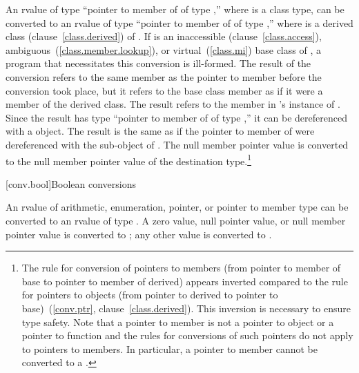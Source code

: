 \pnum
An rvalue of type ``pointer to member of  of type 
,'' where  is a class type, can be converted to
an rvalue of type ``pointer to member of  of type 
,'' where  is a derived class
(clause~\ref{class.derived}) of . If  is an
inaccessible (clause~\ref{class.access}),
ambiguous~(\ref{class.member.lookup}), or virtual~(\ref{class.mi}) base
class of , a program that necessitates this conversion is ill-formed.
The result of the conversion refers to the same member as the pointer to
member before the conversion took place, but it refers to the base class
member as if it were a member of the derived class. The result refers to
the member in 's instance of . Since the result has
type ``pointer to member of  of type  ,''
it can be dereferenced with a  object. The result is the same
as if the pointer to member of  were dereferenced with the
 sub-object of . The null member pointer value is
converted to the null member pointer value of the destination
type.\footnote{The rule for conversion of pointers to members (from pointer to member
of base to pointer to member of derived) appears inverted compared to
the rule for pointers to objects (from pointer to derived to pointer to
base)~(\ref{conv.ptr}, clause~\ref{class.derived}). This inversion is
necessary to ensure type safety. Note that a pointer to member is not
a pointer to object or a pointer to function and the rules for conversions
of such pointers do not apply to pointers to members.
%
In particular, a pointer to member cannot be converted to a
.}

[conv.bool]{Boolean conversions}

\pnum
{}%
An rvalue of arithmetic, enumeration, pointer, or pointer to member
type can be converted to an rvalue of type . A zero value, null
pointer value, or null member pointer value is converted to ; any
other value is converted to .
